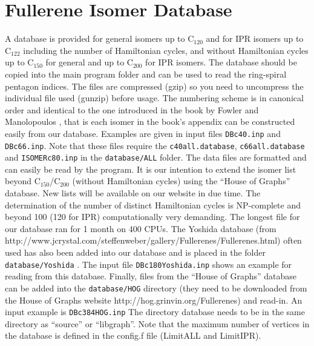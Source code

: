 \documentclass[article,a4paper,twoside]{memoir}
\newcommand{\C}[1]{\ensuremath{\mathrm{C}_{#1}}}
\newcommand{\filename}[1]{\texttt{#1}}
\begin{document}
\section{Fullerene Isomer Database}
A database is provided for general isomers up to \C{120} and for IPR isomers up to
\C{122} including the number of Hamiltonian cycles, and without Hamiltonian cycles
up to \C{150} for general and up to \C{200} for IPR isomers. The database should be copied into
the main program folder and can be used to read the ring-spiral pentagon indices.
The files are compressed (gzip) so you need to uncompress the individual file used (gunzip) before usage.
The numbering scheme is in canonical order and identical to the one introduced in the book by Fowler 
and Manolopoulos \cite{Atlas}, that is each isomer in the book's appendix can be 
constructed easily from our database. Examples are given in input files  \filename{DBc40.inp} and
\filename{DBc66.inp}.  Note that these files require the \filename{c40all.database}, \filename{c66all.database} 
and \filename{ISOMERc80.inp} in the \filename{database/ALL} folder. The data files are formatted and can easily be read
by the program. It is our intention to extend the isomer list beyond \C{150}/\C{200} (without Hamiltonian cycles) using the 
``House of Graphs'' database. New lists will be available on our website in due time.  The determination of the number of
distinct Hamiltonian cycles is NP-complete and beyond 100 (120 for IPR) 
computationally very demanding. The longest file for our database ran for 1 month on 400 CPUs.
The Yoshida database (from http://www.jcrystal.com/steffenweber/gallery/Fullerenes/Fullerenes.html) 
often used has also been added into our database and is placed in the
folder \filename{database/Yoshida} \cite{Yoshida}. The input file \filename{DBc180Yoshida.inp} shows an example for reading from
this database. Finally, files from the ``House of Graphs'' database can be added into the \filename{database/HOG} directory (they
need to be downloaded from the House of Graphs website http://hog.grinvin.org/Fullerenes) and read-in. An input example is
\filename{DBc384HOG.inp}
The directory database needs to be in the same directory as ``source'' or ``libgraph''.
Note that the maximum number of vertices in the database is defined in the config.f file (LimitALL and LimitIPR).
\end{document}
